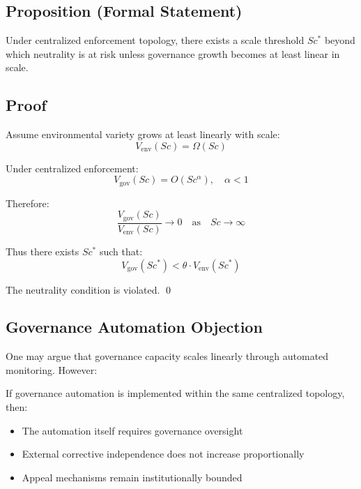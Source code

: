 \documentclass{article}
\begin{document}
\subsection{Proposition (Formal Statement)}

Under centralized enforcement topology, there exists a scale threshold $Sc^*$ beyond which neutrality is at risk unless governance growth becomes at least linear in scale.

\subsection{Proof}

Assume environmental variety grows at least linearly with scale:
\begin{equation}
V_{\text{env}}(Sc) = \Omega(Sc)
\end{equation}

Under centralized enforcement:
\begin{equation}
V_{\text{gov}}(Sc) = O(Sc^{\alpha}), \quad \alpha < 1
\end{equation}

Therefore:
\begin{equation}
\frac{V_{\text{gov}}(Sc)}{V_{\text{env}}(Sc)} \to 0 \quad \text{as} \quad Sc \to \infty
\end{equation}

Thus there exists $Sc^*$ such that:
\begin{equation}
V_{\text{gov}}(Sc^*) < \theta \cdot V_{\text{env}}(Sc^*)
\end{equation}

The neutrality condition is violated. \qed

\subsection{Governance Automation Objection}

One may argue that governance capacity scales linearly through automated monitoring. However:

If governance automation is implemented within the same centralized topology, then:
\begin{itemize}[noitemsep]
    \item The automation itself requires governance oversight
    \item External corrective independence does not increase proportionally
    \item Appeal mechanisms remain institutionally bounded
\end{itemize}
\end{document}
